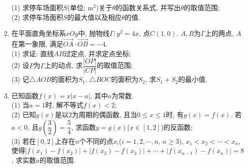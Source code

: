 \documentclass[10pt,a4paper]{article}
\begin{document}
\begin{enumerate}[1.]
\begin{center}
\end{center}
(1) 求停车场面积$S$(单位: $\text{m}^2$)关于$\theta$的函数关系式, 并写出$\theta$的取值范围;\\
(2) 求停车场面积$S$的最大值以及相应$\theta$的值.
\item 在平面直角坐标系$xOy$中, 抛物线$\Gamma:y^2=4x$, 点$C(1,0)$. $A,B$为$\Gamma$上的两点, $A$在第一象限, 满足$\overrightarrow{OA}\cdot \overrightarrow{OB}=-4$.\\
(1) 求证: 直线$AB$过定点, 并求定点坐标;\\
(2) 设$P$为$\Gamma$上的动点, 求$\dfrac{|OP|}{|CP|}$的取值范围;\\
(3) 记$\triangle AOB$的面积为$S_1$, $\triangle BOC$的面积为$S_2$, 求$S_1+S_2$的最小值.
\item 已知函数$f(x)=x|x-a|$, 其中$a$为常数.\\
(1) 当$a=1$时, 解不等式$f(x)<2$;\\
(2) 已知$g(x)$是以$2$为周期的偶函数, 且当$0\le x\le 1$时, 有$g(x)=f(x)$. 若$a<0$, 且$g(\dfrac 32)=\dfrac 54$, 求函数$y=g(x)$($x\in [1,2]$)的反函数;\\
(3) 若在$[0,2]$上存在$n$个不同的点$x_i$($i=1,2,\cdots,n$, $n\ge 3$), $x_1<x_2<\cdots <x_n$, 使得$|f(x_1)-f(x_2)|+|f(x_2)-f(x_3)|+\cdots+|f(x_{n-1})-f(x_n)|=8$, 求实数$a$的取值范围.



\end{enumerate}
\end{document}
